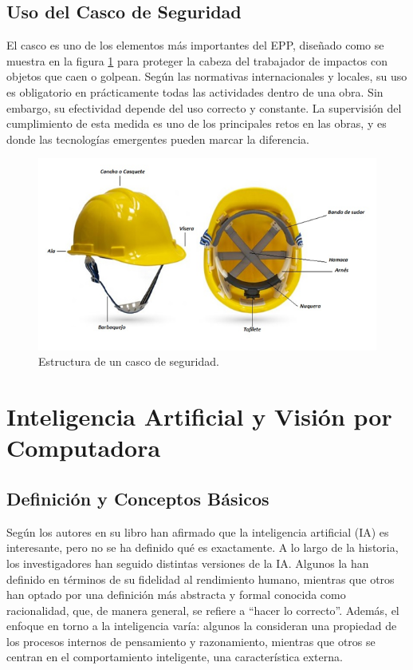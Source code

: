 \subsection{Uso del Casco de Seguridad}

El casco es uno de los elementos más importantes del EPP, diseñado como se muestra en la figura \ref{fig:casco} para proteger la cabeza del trabajador de impactos con objetos que caen o golpean. Según las normativas internacionales y locales, su uso es obligatorio en prácticamente todas las actividades dentro de una obra. Sin embargo, su efectividad depende del uso correcto y constante. La supervisión del cumplimiento de esta medida es uno de los principales retos en las obras, y es donde las tecnologías emergentes pueden marcar la diferencia.

\begin{figure}[!ht]
  \centering
  \includegraphics[width=.49\linewidth]{images/casco.png}
  \caption{Estructura de un casco de seguridad.}
  \label{fig:casco}
\end{figure}

\section{Inteligencia Artificial y Visión por Computadora}

\subsection{Definición y Conceptos Básicos}

Según los autores en su libro \cite{russell2016artificial} han afirmado que la inteligencia artificial (IA) es interesante, pero no se ha definido qué es exactamente. A lo largo de la historia, los investigadores han seguido distintas versiones de la IA. Algunos la han definido en términos de su fidelidad al rendimiento humano, mientras que otros han optado por una definición más abstracta y formal conocida como racionalidad, que, de manera general, se refiere a ``hacer lo correcto''. Además, el enfoque en torno a la inteligencia varía: algunos la consideran una propiedad de los procesos internos de pensamiento y razonamiento, mientras que otros se centran en el comportamiento inteligente, una característica externa.

